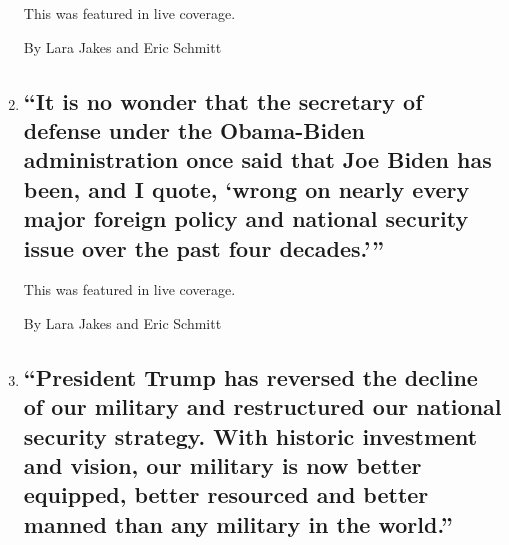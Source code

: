 \begin{enumerate}
  This was featured in live coverage.

  By Lara Jakes and Eric Schmitt
\item
  \href{/live/2020/08/26/us/rnc-fact-check/it-is-no-wonder-that-the-secretary-of-defense-under-the-obama-biden-administration-once-said-that-joe-biden-has-been-and-i-quote}{}

  \hypertarget{it-is-no-wonder-that-the-secretary-of-defense-under-the-obama-biden-administration-once-said-that-joe-biden-has-been-and-i-quote-wrong-on-nearly-every-major-foreign-policy-and-national-security-issue-over-the-past-four-decades}{%
  \subsection{``It is no wonder that the secretary of defense under the
  Obama-Biden administration once said that Joe Biden has been, and I
  quote, `wrong on nearly every major foreign policy and national
  security issue over the past four
  decades.'''}\label{it-is-no-wonder-that-the-secretary-of-defense-under-the-obama-biden-administration-once-said-that-joe-biden-has-been-and-i-quote-wrong-on-nearly-every-major-foreign-policy-and-national-security-issue-over-the-past-four-decades}}

  This was featured in live coverage.

  By Lara Jakes and Eric Schmitt
\item
  \href{/live/2020/08/26/us/rnc-fact-check/president-trump-has-reversed-the-decline-of-our-military-and-restructured-our-national-security-strategy-with-historic-investmen}{}

  \hypertarget{president-trump-has-reversed-the-decline-of-our-military-and-restructured-our-national-security-strategy-with-historic-investment-and-vision-our-military-is-now-better-equipped-better-resourced-and-better-manned-than-any-military-in-the-world}{%
  \subsection{``President Trump has reversed the decline of our military
  and restructured our national security strategy. With historic
  investment and vision, our military is now better equipped, better
  resourced and better manned than any military in the
  world.''}\label{president-trump-has-reversed-the-decline-of-our-military-and-restructured-our-national-security-strategy-with-historic-investment-and-vision-our-military-is-now-better-equipped-better-resourced-and-better-manned-than-any-military-in-the-world}}


\end{enumerate}
